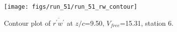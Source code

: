 \begin{figure}[H]
\centering
\texttt{[image: figs/run\_51/run\_51\_rw\_contour]}
\caption{Contour plot of $\overline{r^\prime w^\prime}$ at $z/c$=9.50, $V_{free}$=15.31, station 6.}
\end{figure}



